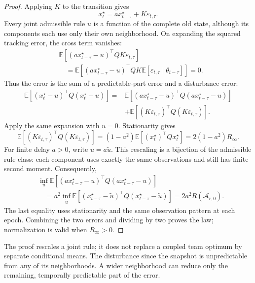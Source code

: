 \documentclass[11pt]{article}
\begin{document}
\begin{proof}
Applying $K$ to the transition gives
\begin{equation}
x_t^\star=a x_{t-\tau}^\star+K\varepsilon_{t,\tau}.
\label{eq:xstar_innovation_decomposition}
\end{equation}
Every joint admissible rule $u$ is a function of the complete old state,
although its components each use only their own neighborhood. On expanding
the squared tracking error, the cross term vanishes:
\begin{align*}
&\mathbb E[(a x_{t-\tau}^\star-u)^\top QK\varepsilon_{t,\tau}]\\
&\quad=\mathbb E[(a x_{t-\tau}^\star-u)^\top QK
\mathbb E[\varepsilon_{t,\tau}\mid\theta_{t-\tau}]]=0.
\end{align*}
Thus the error is the sum of a predictable-part error and a disturbance error:
\begin{align}
\mathbb E[(x_t^\star-u)^\top Q(x_t^\star-u)]
={}&\mathbb E[(a x_{t-\tau}^\star-u)^\top Q(a x_{t-\tau}^\star-u)]\nonumber\\
&+\mathbb E[(K\varepsilon_{t,\tau})^\top Q(K\varepsilon_{t,\tau})].
\label{eq:innovation_split}
\end{align}
Apply the same expansion with $u=0$. Stationarity gives
\begin{equation}
\mathbb E[(K\varepsilon_{t,\tau})^\top Q(K\varepsilon_{t,\tau})]
=(1-a^2)\mathbb E[(x_t^\star)^\top Qx_t^\star]=2(1-a^2)R_\infty.
\label{eq:innovation_energy}
\end{equation}
For finite delay $a>0$, write $u=a\widetilde u$. This rescaling is a
bijection of the admissible rule class: each component uses exactly the
same observations and still has finite second moment. Consequently,
\begin{align}
&\inf_u\mathbb E[(a x_{t-\tau}^\star-u)^\top Q(a x_{t-\tau}^\star-u)]\nonumber\\
&\quad=a^2\inf_{\widetilde u}\mathbb E[(x_{t-\tau}^\star-\widetilde u)^\top
Q(x_{t-\tau}^\star-\widetilde u)]
=2a^2R(\mathcal A_{r,0}).
\label{eq:policy_rescaling}
\end{align}
The last equality uses stationarity and the same observation pattern at
each epoch. Combining the two errors and dividing by two proves the law;
normalization is valid when $R_\infty>0$.
\end{proof}

The proof rescales a joint rule; it does not replace a coupled team optimum
by separate conditional means. The disturbance since the snapshot is
unpredictable from any of its neighborhoods. A wider neighborhood can
reduce only the remaining, temporally predictable part of the error.
\end{document}
